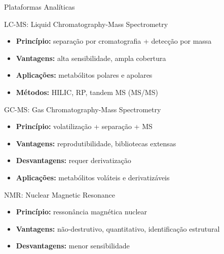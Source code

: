 \begin{frame}{Plataformas Analíticas}
\begin{block}{LC-MS: Liquid Chromatography-Mass Spectrometry}
\begin{itemize}
    \item \textbf{Princípio:} separação por cromatografia + detecção por massa
    \item \textbf{Vantagens:} alta sensibilidade, ampla cobertura
    \item \textbf{Aplicações:} metabólitos polares e apolares
    \item \textbf{Métodos:} HILIC, RP, tandem MS (MS/MS)
\end{itemize}
\end{block}

\begin{block}{GC-MS: Gas Chromatography-Mass Spectrometry}
\begin{itemize}
    \item \textbf{Princípio:} volatilização + separação + MS
    \item \textbf{Vantagens:} reprodutibilidade, bibliotecas extensas
    \item \textbf{Desvantagens:} requer derivatização
    \item \textbf{Aplicações:} metabólitos voláteis e derivatizáveis
\end{itemize}
\end{block}

\begin{block}{NMR: Nuclear Magnetic Resonance}
\begin{itemize}
    \item \textbf{Princípio:} ressonância magnética nuclear
    \item \textbf{Vantagens:} não-destrutivo, quantitativo, identificação estrutural
    \item \textbf{Desvantagens:} menor sensibilidade
\end{itemize}
\end{block}
\end{frame}

